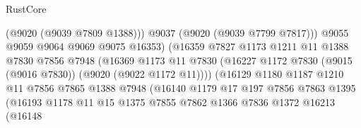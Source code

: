 \begin{lexlean}{RustCore}
\begin{coremodule}
                                          (@9020 (@9039 @7809 @1388)))
                                        @9037
                                        (@9020 (@9039 @7799 @7817)))
                                      @9055
                                      @9059
                                      @9064
                                      @9069
                                      @9075
                                      @16353)
                                    (@16359
                                      @7827
                                      @1173
                                      @1211
                                      @11
                                      @1388
                                      @7830
                                      @7856
                                      @7948
                                      (@16369
                                        @1173
                                        @11
                                        @7830
                                        (@16227
                                          @1172
                                          @7830
                                          (@9015 (@9016 @7830))
                                          (@9020 (@9022 @1172 @11))))
                                      (@16129
                                        @1180
                                        @1187
                                        @1210
                                        @11
                                        @7856
                                        @7865
                                        @1388
                                        @7948
                                        (@16140
                                          @1179
                                          @17
                                          @197
                                          @7856
                                          @7863
                                          @1395
                                          (@16193
                                            @1178
                                            @11
                                            @15
                                            @1375
                                            @7855
                                            @7862
                                            @1366
                                            @7836
                                            @1372
                                            @16213
                                            (@16148

\end{coremodule}
\end{lexlean}
